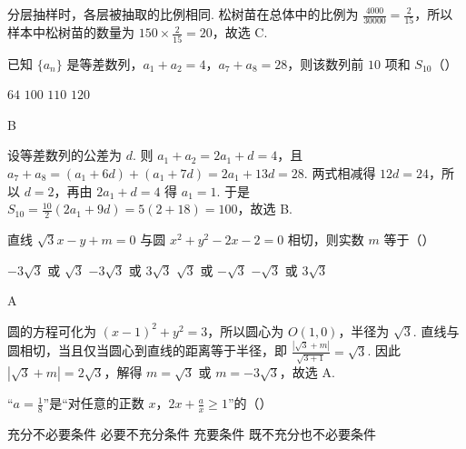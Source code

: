 \begin{solution}
分层抽样时，各层被抽取的比例相同. 松树苗在总体中的比例为
\(\frac{4000}{30000}=\frac{2}{15}\)，所以样本中松树苗的数量为
\(150\times\frac{2}{15}=20\)，故选 C.
\end{solution}

\begin{problem}
已知 \(\{a_{n}\}\) 是等差数列，\(a_{1} + a_{2} = 4\)，\(a_{7} + a_{8} = 28\)，则该数列前 \(10\) 项和 \(S_{10}\)（\quad）

\choices
    {\(64\)}
    {\(100\)}
    {\(110\)}
    {\(120\)}
\end{problem}

\begin{answer}
B
\end{answer}

\begin{solution}
设等差数列的公差为 \(d\). 则
\(a_1+a_2=2a_1+d=4\)，且
\(a_7+a_8=(a_1+6d)+(a_1+7d)=2a_1+13d=28\).
两式相减得 \(12d=24\)，所以 \(d=2\)，再由 \(2a_1+d=4\) 得 \(a_1=1\).
于是
\(S_{10}=\frac{10}{2}\left(2a_1+9d\right)=5(2+18)=100\)，故选 B.
\end{solution}

\begin{problem}
直线 \(\sqrt{3} x - y + m = 0\) 与圆 \(x^{2} + y^{2} - 2x - 2 = 0\) 相切，则实数 \(m\) 等于（\quad）

\choices
    {\(-3\sqrt{3}\) 或 \(\sqrt{3}\)}
    {\(-3\sqrt{3}\) 或 \(3\sqrt{3}\)}
    {\(\sqrt{3}\) 或 \(-\sqrt{3}\)}
    {\(-\sqrt{3}\) 或 \(3\sqrt{3}\)}
\end{problem}

\begin{answer}
A
\end{answer}

\begin{solution}
圆的方程可化为
\(\left(x-1\right)^2+y^2=3\)，所以圆心为 \(O(1,0)\)，半径为 \(\sqrt{3}\).
直线与圆相切，当且仅当圆心到直线的距离等于半径，即
\(\frac{|\sqrt{3}+m|}{\sqrt{3+1}}=\sqrt{3}\).
因此 \(|\sqrt{3}+m|=2\sqrt{3}\)，解得
\(m=\sqrt{3}\) 或 \(m=-3\sqrt{3}\)，故选 A.
\end{solution}

\begin{problem}
“\(a=\frac{1}{8}\)”是“对任意的正数 \(x\)，\(2x+\frac{a}{x}\geqslant1\)”的（\quad）

\choices
    {充分不必要条件}
    {必要不充分条件}
    {充要条件}
    {既不充分也不必要条件}
\end{problem}

